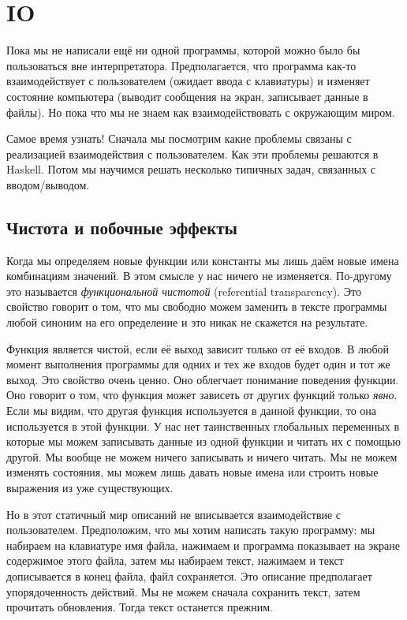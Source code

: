 \setcounter{chapter}{10}
\chapter{IO}

Пока мы не написали ещё ни одной программы, которой
можно было бы пользоваться вне интерпретатора. 
Предполагается, что программа как-то взаимодействует
с пользователем (ожидает ввода с клавиатуры) и 
изменяет состояние компьютера 
(выводит сообщения на экран, записывает данные в файлы).
Но пока что мы не знаем как взаимодействовать 
с окружающим миром. 

Самое время узнать! Сначала мы посмотрим какие
проблемы связаны с реализацией взаимодействия 
с пользователем. Как эти проблемы решаются в
Haskell. Потом мы научимся решать несколько 
типичных задач, связанных с вводом/выводом.

\section{Чистота и побочные эффекты}

Когда мы определяем новые функции или константы
мы лишь даём новые имена комбинациям значений.
В этом смысле у нас ничего не изменяется.
По-другому  это называется \emph{функциональной
чистотой} (referential transparency). Это свойство 
говорит о том, что мы свободно можем заменить 
в тексте программы любой синоним на его определение
и это никак не скажется на результате.

Функция является чистой, если её выход зависит только 
от её входов. В любой момент выполнения программы 
для одних и тех же входов будет один и тот же выход.
Это свойство очень ценно. Оно облегчает понимание
поведения функции. Оно говорит о том, что функция
может зависеть от других функций только \emph{явно}.
Если мы видим, что другая функция используется
в данной функции, то она используется в этой функции. 
У нас нет таинственных глобальных переменных в которые мы можем
записывать данные из одной функции и читать их с помощью
другой. Мы вообще не можем ничего записывать и ничего
читать. Мы не можем изменять состояния, мы можем лишь давать
новые имена или строить новые выражения из уже существующих. 

Но в этот статичный мир описаний не вписывается
взаимодействие с пользователем. Предположим, что
мы хотим написать такую программу: мы набираем на 
клавиатуре имя файла, нажимаем  и программа 
показывает на экране содержимое этого файла, затем мы набираем текст,
нажимаем  и текст дописывается в конец файла,
файл сохраняется. 
Это описание предполагает упорядоченность действий.
Мы не можем сначала сохранить текст, затем прочитать обновления.
Тогда текст останется прежним. 

